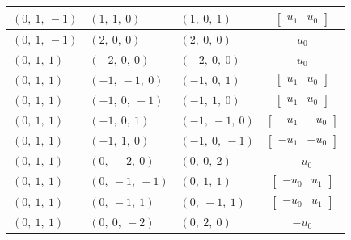 \documentclass[11pt]{article}
\theoremstyle{definition}
\begin{document}
\begin{longtable}{|l|l|l|c|}
    \hline
    $\left( 0, \  1, \  -1\right)$ & $\left( 1, \  1, \  0\right)$ & $\left( 1, \  0, \  1\right)$ & $\left[\begin{matrix}u_{1} & u_{0}\end{matrix}\right]$ \\
    \hline
    $\left( 0, \  1, \  -1\right)$ & $\left( 2, \  0, \  0\right)$ & $\left( 2, \  0, \  0\right)$ & $u_{0}$ \\
    \hline
    $\left( 0, \  1, \  1\right)$ & $\left( -2, \  0, \  0\right)$ & $\left( -2, \  0, \  0\right)$ & $u_{0}$ \\
    \hline
    $\left( 0, \  1, \  1\right)$ & $\left( -1, \  -1, \  0\right)$ & $\left( -1, \  0, \  1\right)$ & $\left[\begin{matrix}u_{1} & u_{0}\end{matrix}\right]$ \\
    \hline
    $\left( 0, \  1, \  1\right)$ & $\left( -1, \  0, \  -1\right)$ & $\left( -1, \  1, \  0\right)$ & $\left[\begin{matrix}u_{1} & u_{0}\end{matrix}\right]$ \\
    \hline
    $\left( 0, \  1, \  1\right)$ & $\left( -1, \  0, \  1\right)$ & $\left( -1, \  -1, \  0\right)$ & $\left[\begin{matrix}- u_{1} & - u_{0}\end{matrix}\right]$ \\
    \hline
    $\left( 0, \  1, \  1\right)$ & $\left( -1, \  1, \  0\right)$ & $\left( -1, \  0, \  -1\right)$ & $\left[\begin{matrix}- u_{1} & - u_{0}\end{matrix}\right]$ \\
    \hline
    $\left( 0, \  1, \  1\right)$ & $\left( 0, \  -2, \  0\right)$ & $\left( 0, \  0, \  2\right)$ & $- u_{0}$ \\
    \hline
    $\left( 0, \  1, \  1\right)$ & $\left( 0, \  -1, \  -1\right)$ & $\left( 0, \  1, \  1\right)$ & $\left[\begin{matrix}- u_{0} & u_{1}\end{matrix}\right]$ \\
    \hline
    $\left( 0, \  1, \  1\right)$ & $\left( 0, \  -1, \  1\right)$ & $\left( 0, \  -1, \  1\right)$ & $\left[\begin{matrix}- u_{0} & u_{1}\end{matrix}\right]$ \\
    \hline
    $\left( 0, \  1, \  1\right)$ & $\left( 0, \  0, \  -2\right)$ & $\left( 0, \  2, \  0\right)$ & $- u_{0}$ \\

\end{longtable}
\end{document}
